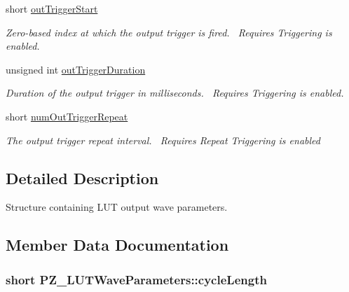 \begin{DoxyCompactItemize}
short \hyperlink{struct_p_z___l_u_t_wave_parameters_a0595ba5f0fe25c63e2f944cc47788fc7}{out\+Trigger\+Start}
\begin{DoxyCompactList}\small\item\em Zero-\/based index at which the output trigger is fired.~\newline
 Requires Triggering is enabled. \end{DoxyCompactList}\item 
unsigned int \hyperlink{struct_p_z___l_u_t_wave_parameters_ae6302f2ebf0b3c1056109bd00fcdc855}{out\+Trigger\+Duration}
\begin{DoxyCompactList}\small\item\em Duration of the output trigger in milliseconds.~\newline
 Requires Triggering is enabled. \end{DoxyCompactList}\item 
short \hyperlink{struct_p_z___l_u_t_wave_parameters_ab741cc806b9f66a2f86eeec057cfe102}{num\+Out\+Trigger\+Repeat}
\begin{DoxyCompactList}\small\item\em The output trigger repeat interval.~\newline
 Requires Repeat Triggering is enabled \end{DoxyCompactList}\end{DoxyCompactItemize}


\subsection{Detailed Description}
Structure containing L\+UT output wave parameters. 



\subsection{Member Data Documentation}
\subsubsection[{\texorpdfstring{cycle\+Length}{cycleLength}}]{\setlength{\rightskip}{0pt plus 5cm}short P\+Z\+\_\+\+L\+U\+T\+Wave\+Parameters\+::cycle\+Length}\hypertarget{struct_p_z___l_u_t_wave_parameters_aa41888de73eb1ef3d80e1ef85118dc2e}{}\label{struct_p_z___l_u_t_wave_parameters_aa41888de73eb1ef3d80e1ef85118dc2e}


